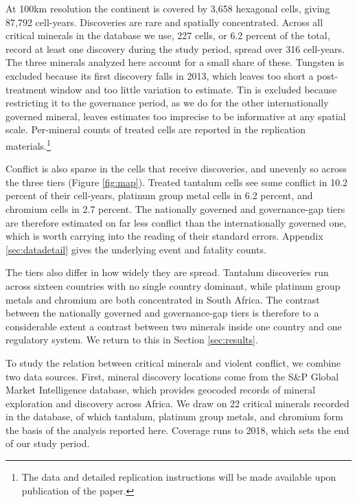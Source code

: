 \documentclass[11pt]{article}
\begin{document}
At 100km resolution the continent is covered by 3,658 hexagonal cells, giving 87,792 cell-years. Discoveries are rare and spatially concentrated. Across all critical minerals in the database we use, 227 cells, or 6.2 percent of the total, record at least one discovery during the study period, spread over 316 cell-years. The three minerals analyzed here account for a small share of these. Tungsten is excluded because its first discovery falls in 2013, which leaves too short a post-treatment window and too little variation to estimate. Tin is excluded because restricting it to the governance period, as we do for the other internationally governed mineral, leaves estimates too imprecise to be informative at any spatial scale. Per-mineral counts of treated cells are reported in the replication materials.\footnote{The data and detailed replication instructions will be made available upon publication of the paper.}

Conflict is also sparse in the cells that receive discoveries, and unevenly so across the three tiers (Figure \ref{fig:map}). Treated tantalum cells see some conflict in 10.2 percent of their cell-years, platinum group metal cells in 6.2 percent, and chromium cells in 2.7 percent. The nationally governed and governance-gap tiers are therefore estimated on far less conflict than the internationally governed one, which is worth carrying into the reading of their standard errors. Appendix \ref{sec:datadetail} gives the underlying event and fatality counts.

The tiers also differ in how widely they are spread. Tantalum discoveries run across sixteen countries with no single country dominant, while platinum group metals and chromium are both concentrated in South Africa. The contrast between the nationally governed and governance-gap tiers is therefore to a considerable extent a contrast between two minerals inside one country and one regulatory system. We return to this in Section \ref{sec:results}.

To study the relation between critical minerals and violent conflict, we combine two data sources. First, mineral discovery locations come from the S\&P Global Market Intelligence database, which provides geocoded records of mineral exploration and discovery across Africa. We draw on 22 critical minerals recorded in the database, of which tantalum, platinum group metals, and chromium form the basis of the analysis reported here. Coverage runs to 2018, which sets the end of our study period.
\end{document}

